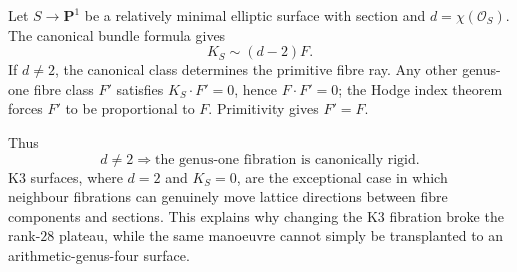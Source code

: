 Let $S\to\mathbf P^1$ be a relatively minimal elliptic surface with section
and $d=\chi(\mathcal O_S)$.  The canonical bundle formula gives
\[
K_S\sim(d-2)F.
\]
If $d\ne2$, the canonical class determines the primitive fibre ray.  Any
other genus-one fibre class $F'$ satisfies $K_S\cdot F'=0$, hence
$F\cdot F'=0$; the Hodge index theorem forces $F'$ to be proportional to
$F$.  Primitivity gives $F'=F$.

Thus
\[
\boxed{d\ne2\Longrightarrow\text{the genus-one fibration is canonically rigid}.}
\]
K3 surfaces, where $d=2$ and $K_S=0$, are the exceptional case in which
neighbour fibrations can genuinely move lattice directions between fibre
components and sections.  This explains why changing the K3 fibration broke
the rank-$28$ plateau, while the same manoeuvre cannot simply be transplanted
to an arithmetic-genus-four surface.
